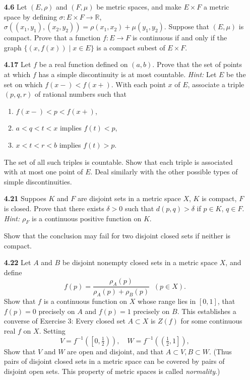 \documentclass[11pt]{article}
\begin{document}
\begin{itemize}
  \item [\textbf{4.6}]
    Let \((E, \rho)\) and \((F, \mu)\) be metric spaces, and make \(E \times F\) a metric space by defining 
    \(\sigma \colon E \times F \to \mathbb{R}\), \(\sigma\left((x_1,y_1), (x_2,y_2)\right) = \rho(x_1,x_2) + \mu(y_1,y_2)\).  
    Suppose that \((E, \mu)\) is compact.  Prove that a function \(f \colon E \to F\) is continuous if and only if the graph 
    \(\{\left(x,f(x)\right) \mid x \in E\}\) is a compact subest of \(E \times F\).
  \newpage


  \item [\textbf{4.17}]
    Let \(f\) be a real function defined on \((a,b)\).  Prove that the set of points at which \(f\) has a simple discontinuity
    is at most countable.  \textit{Hint:} Let \(E\) be the set on which \(f(x-) < f(x+)\).  With each point \(x\) of \(E\), 
    associate a triple \((p,q,r)\) of rational numbers such that
    \begin{enumerate}[label=(\alph*)]
      \item \(f(x-) < p < f(x+)\),
      \item \(a < q < t < x\) implies \(f(t) < p\),
      \item \(x < t < r < b\) implies \(f(t) > p\).
    \end{enumerate}
    The set of all such triples is countable.  Show that each triple is associated with at most one point of \(E\).  Deal 
    similarly with the other possible types of simple discontinuities.
  \newpage


  \item [\textbf{4.21}]
    Suppoes \(K\) and \(F\) are disjoint sets in a metric space \(X\), \(K\) is compact, \(F\) is closed.  Prove that there 
    exists \(\delta > 0\) such that \(d(p,q) > \delta\) if \(p \in K\), \(q \in F\).  \textit{Hint:} \(\rho_F\) is a continuous 
    positive function on \(K\).

    Show that the conclusion may fail for two disjoint closed sets if neither is compact.
  \newpage


  \item [\textbf{4.22}]
    Let \(A\) and \(B\) be disjoint nonempty closed sets in a metric space \(X\), and define
    \[f(p) = \frac{\rho_A(p)}{\rho_A(p) + \rho_B(p)} \;\; (p \in X).\]
    Show that \(f\) is a continuous function on \(X\) whose range lies in \([0,1]\), that \(f(p) = 0\) precisely on \(A\) 
    and \(f(p) = 1\) precisely on \(B\).  This establishes a converse of Exercise 3: Every closed set \(A \subset X\) is 
    \(Z(f)\) for some continuous real \(f\) on \(X\).  Setting
    \[V = f^{-1}\left(\left[0, \tfrac12\right)\right), \quad W = f^{-1}\left(\left(\tfrac12,1\right]\right),\]
    Show that \(V\) and \(W\) are open and disjoint, and that \(A \subset V, B \subset W\).  (Thus pairs of disjoint closed 
    sets in a metric space can be covered by pairs of disjoint open sets.  This property of metric spaces is called 
    \textit{normality}.)
  \newpage



\end{itemize}
\end{document}

